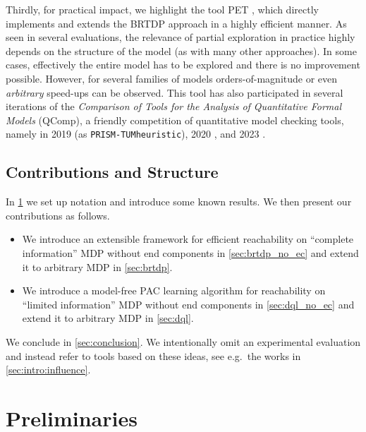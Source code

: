 \documentclass{article}
\begin{document}
Thirdly, for practical impact, we highlight the tool PET \cite{DBLP:conf/atva/Meggendorfer22,DBLP:conf/cav/MeggendorferW24}, which directly implements and extends the BRTDP approach in a highly efficient manner.
As seen in several evaluations, the relevance of partial exploration in practice highly depends on the structure of the model (as with many other approaches).
In some cases, effectively the entire model has to be explored and there is no improvement possible.
However, for several families of models orders-of-magnitude or even \emph{arbitrary} speed-ups can be observed.
This tool has also participated in several iterations of the \emph{Comparison of Tools for the Analysis of Quantitative Formal Models} (QComp), a friendly competition of quantitative model checking tools, namely in 2019 \cite{DBLP:conf/tacas/HahnHHKKKPQRS19} (as \texttt{PRISM-TUMheuristic}), 2020 \cite{DBLP:conf/isola/BuddeHKKPQTZ20}, and 2023 \cite{qcomp2023}.

\subsection{Contributions and Structure}

In \cref{sec:preliminaries} we set up notation and introduce some known results.
We then present our contributions as follows.
\begin{itemize}
	\item We introduce an extensible framework for efficient reachability on \enquote{complete information} MDP without end components in \cref{sec:brtdp_no_ec} and extend it to arbitrary MDP in \cref{sec:brtdp}.
	\item We introduce a model-free PAC learning algorithm for reachability on \enquote{limited information} MDP without end components in \cref{sec:dql_no_ec} and extend it to arbitrary MDP in \cref{sec:dql}.
\end{itemize}
We conclude in \cref{sec:conclusion}.
We intentionally omit an experimental evaluation and instead refer to tools based on these ideas, see e.g.\ the works in \cref{sec:intro:influence}.
 	\section{Preliminaries} \label{sec:preliminaries}
\end{document}

